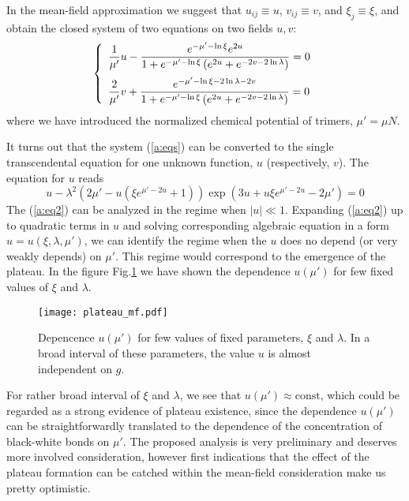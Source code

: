 \documentclass[aps,12pt]{revtex4}
\newcommand{\eq}[1]{(\ref{#1})}
\newcommand{\fig}[1]{Fig.\ref{#1}}
\newcommand{\be}{\begin{equation}}
\newcommand{\ee}{\end{equation}}
\newcommand\disp{\displaystyle}
\begin{document}
\begin{appendix}
In the mean-field approximation we suggest that $u_{ij}\equiv u$, $v_{ij}\equiv v$, and $\xi_j\equiv \xi$, and obtain the closed system of two equations on two fields $u,v$:
\be
\left\{\begin{array}{l} \disp \frac{1}{\mu'} u - \frac{e^{-\mu'-\ln\xi} e^{2u}}{1+e^{-\mu'-\ln\xi}\left(e^{2u}+e^{-2v-2\ln \lambda}\right)} = 0 \medskip \\
\disp \frac{2}{\mu'} v + \frac{e^{-\mu'-\ln\xi-2\ln\lambda-2v}} {1+e^{-\mu'-\ln\xi}\left(e^{2u}+e^{-2v-2\ln \lambda}\right)}=0
\end{array} \right.
\label{a:eqs}
\ee
where we have introduced the normalized chemical potential of trimers, $\mu' = \mu N$.

It turns out that the system \eq{a:eqs} can be converted to the single transcendental equation for one unknown function, $u$ (respectively,  $v$). The equation for $u$ reads
\be
u-\lambda^2\left(2\mu'-u\left(\xi e^{\mu'-2u}+1\right)\right)\exp\left(3u+u\xi e^{\mu'-2u}-2\mu'\right)=0
\label{a:eq2}
\ee
The \eq{a:eq2} can be analyzed in the regime when $|u|\ll 1$. Expanding \eq{a:eq2} up to quadratic terms in $u$ and solving corresponding algebraic equation in a form $u=u(\xi,\lambda,\mu')$, we can identify the regime when the $u$ does no depend (or very weakly depends) on $\mu'$. This regime would correspond to the emergence of the plateau. In the figure \fig{a:plateau} we have shown the dependence $u(\mu')$ for few fixed values of $\xi$ and $\lambda$.

\begin{figure}[ht]
\centerline{\texttt{[image: plateau\_mf.pdf]}}
\caption{Depencence $u(\mu')$ for few values of fixed parameters, $\xi$ and $\lambda$. In a broad interval of these parameters, the value $u$ is almost independent on $g$.}
\label{a:plateau}
\end{figure}

For rather broad interval of $\xi$ and $\lambda$, we see that $u(\mu')\approx \mathrm{const}$, which could be regarded as a strong evidence of plateau existence, since the dependence $u(\mu')$ can be straightforwardly translated to the dependence of the concentration of black-white bonds on $\mu'$. The proposed analysis is very preliminary and deserves more involved consideration, however first indications that the effect of the plateau formation can be catched within the mean-field consideration make us pretty optimistic.

\end{appendix}
\end{document}
